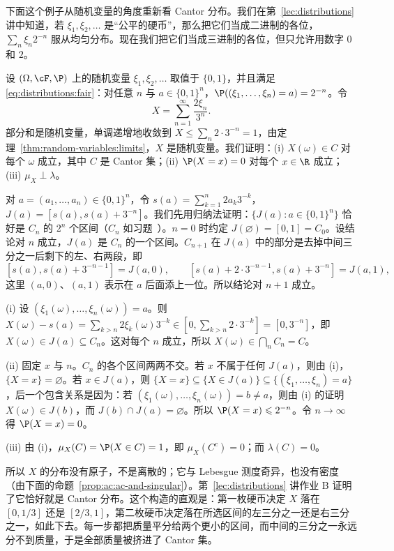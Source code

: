 下面这个例子从随机变量的角度重新看 Cantor 分布。我们在第~\ref{lec:distributions} 讲中知道，若 $\xi_1,\xi_2,\dots$ 是“公平的硬币”，那么把它们当成二进制的各位，$\sum_n\xi_n2^{-n}$ 服从均匀分布。现在我们把它们当成三进制的各位，但只允许用数字 $0$ 和 $2$。

\begin{example}[用硬币构造的奇异分布]\label{ex:ac:cantor-coins}
设 $(\Omega,\cF,\P)$ 上的随机变量 $\xi_1,\xi_2,\dots$ 取值于 $\{0,1\}$，并且满足 \eqref{eq:distributions:fair}：对任意 $n$ 与 $a\in\{0,1\}^n$，$\P((\xi_1,\dots,\xi_n)=a)=2^{-n}$。令
\[
X=\sum_{n=1}^\infty\frac{2\xi_n}{3^n}.
\]
部分和是随机变量，单调递增地收敛到 $X\leqslant\sum_n2\cdot3^{-n}=1$，由定理~\ref{thm:random-variables:limits}，$X$ 是随机变量。我们证明：(i) $X(\omega)\in C$ 对每个 $\omega$ 成立，其中 $C$ 是 Cantor 集；(ii) $\P(X=x)=0$ 对每个 $x\in\R$ 成立；(iii) $\mu_X\perp\lambda$。

对 $a=(a_1,\dots,a_n)\in\{0,1\}^n$，令 $s(a)=\sum_{k=1}^n2a_k3^{-k}$，$J(a)=[s(a),s(a)+3^{-n}]$。我们先用归纳法证明：$\{J(a):a\in\{0,1\}^n\}$ 恰好是 $C_n$ 的 $2^n$ 个区间（$C_n$ 如习题~）。$n=0$ 时约定 $J(\varnothing)=[0,1]=C_0$。设结论对 $n$ 成立，$J(a)$ 是 $C_n$ 的一个区间。$C_{n+1}$ 在 $J(a)$ 中的部分是去掉中间三分之一后剩下的左、右两段，即
\[
[s(a),s(a)+3^{-n-1}]=J(a,0),\qquad[s(a)+2\cdot3^{-n-1},s(a)+3^{-n}]=J(a,1),
\]
这里 $(a,0)$、$(a,1)$ 表示在 $a$ 后面添上一位。所以结论对 $n+1$ 成立。

(i) 设 $(\xi_1(\omega),\dots,\xi_n(\omega))=a$。则 $X(\omega)-s(a)=\sum_{k>n}2\xi_k(\omega)3^{-k}\in[0,\sum_{k>n}2\cdot3^{-k}]=[0,3^{-n}]$，即 $X(\omega)\in J(a)\subseteq C_n$。这对每个 $n$ 成立，所以 $X(\omega)\in\bigcap_nC_n=C$。

(ii) 固定 $x$ 与 $n$。$C_n$ 的各个区间两两不交。若 $x$ 不属于任何 $J(a)$，则由 (i)，$\{X=x\}=\varnothing$。若 $x\in J(a)$，则 $\{X=x\}\subseteq\{X\in J(a)\}\subseteq\{(\xi_1,\dots,\xi_n)=a\}$，后一个包含关系是因为：若 $(\xi_1(\omega),\dots,\xi_n(\omega))=b\neq a$，则由 (i) 的证明 $X(\omega)\in J(b)$，而 $J(b)\cap J(a)=\varnothing$。所以 $\P(X=x)\leqslant2^{-n}$。令 $n\to\infty$ 得 $\P(X=x)=0$。

(iii) 由 (i)，$\mu_X(C)=\P(X\in C)=1$，即 $\mu_X(C^c)=0$；而 $\lambda(C)=0$。

所以 $X$ 的分布没有原子，不是离散的；它与 Lebesgue 测度奇异，也没有密度（由下面的命题~\ref{prop:ac:ac-and-singular}）。第~\ref{lec:distributions} 讲作业 B 证明了它恰好就是 Cantor 分布。这个构造的直观是：第一枚硬币决定 $X$ 落在 $[0,1/3]$ 还是 $[2/3,1]$，第二枚硬币决定落在所选区间的左三分之一还是右三分之一，如此下去。每一步都把质量平分给两个更小的区间，而中间的三分之一永远分不到质量，于是全部质量被挤进了 Cantor 集。
\end{example}

